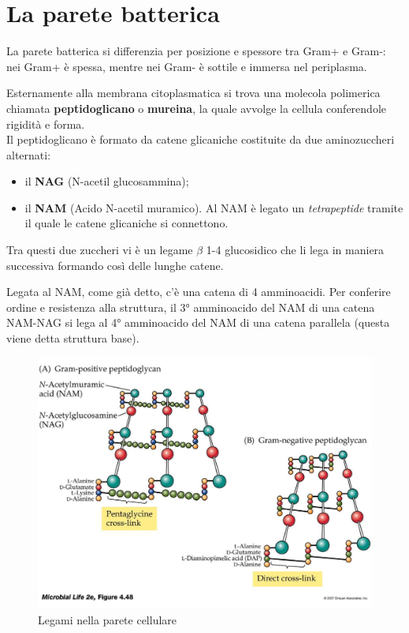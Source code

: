 \documentclass[11pt]{book}
\begin{document}
\section{La parete batterica}

La parete batterica si differenzia per posizione e spessore tra Gram+ e Gram-: nei Gram+ è spessa, mentre nei Gram- è sottile e immersa nel periplasma.

Esternamente alla membrana citoplasmatica si trova una molecola polimerica chiamata \textbf{peptidoglicano} o \textbf{mureina}, la quale avvolge la cellula conferendole rigidità e forma.\\
Il peptidoglicano è formato da catene glicaniche costituite da due aminozuccheri alternati:
\begin{itemize}
\item il \textbf{NAG} (N-acetil glucosammina);
\item il \textbf{NAM} (Acido N-acetil muramico). Al NAM è legato un \emph{tetrapeptide} tramite il quale le catene glicaniche si connettono.
\end{itemize}

Tra questi due zuccheri vi è un legame $\beta$ 1-4 glucosidico che li lega in maniera successiva formando così delle lunghe catene.

\vspace{1em}
Legata al NAM, come già detto, c’è una catena di 4 amminoacidi. Per conferire ordine e resistenza alla struttura, il 3° amminoacido del NAM di una catena NAM-NAG si lega al 4° amminoacido del NAM di una catena parallela (questa viene detta struttura base).

\clearpage
\begin{figure}[htp]
\centering
\includegraphics[scale=0.25]{img/NAM_NAG.jpg}
\caption{Legami nella parete cellulare}
\label{Legami parete cellulare}
\end{figure}
\end{document}
